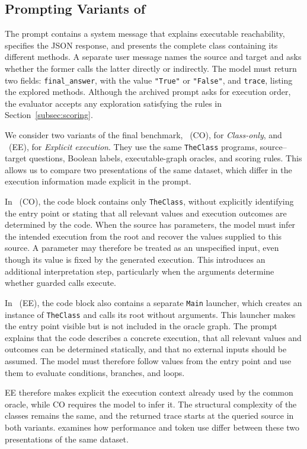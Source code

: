 \subsection{Prompting Variants of \benchmark}
\label{subsec:prompt-design}

The prompt contains a system message that explains executable reachability, specifies the JSON response, and presents the complete class containing its different methods. A separate user message names the source and target and asks whether the former calls the latter directly or indirectly. The model must return two fields: \texttt{final\_answer}, with the value \texttt{"True"} or \texttt{"False"}, and \texttt{trace}, listing the explored methods. Although the archived prompt asks for execution order, the evaluator accepts any exploration satisfying the rules in Section~\ref{subsec:scoring}.

We consider two variants of the final benchmark, \benchmark~(CO), for \emph{Class-only}, and \benchmark~(EE), for \emph{Explicit execution}. They use the same \texttt{TheClass} programs, source--target questions, Boolean labels, executable-graph oracles, and scoring rules. This allows us to compare two presentations of the same dataset, which differ in the execution information made explicit in the prompt.

In \benchmark~(CO), the code block contains only \texttt{TheClass}, without explicitly identifying the entry point or stating that all relevant values and execution outcomes are determined by the code. When the source has parameters, the model must infer the intended execution from the root and recover the values supplied to this source. A parameter may therefore be treated as an unspecified input, even though its value is fixed by the generated execution. This introduces an additional interpretation step, particularly when the arguments determine whether guarded calls execute.

In \benchmark~(EE), the code block also contains a separate \texttt{Main} launcher, which creates an instance of \texttt{TheClass} and calls its root without arguments. This launcher makes the entry point visible but is not included in the oracle graph. The prompt explains that the code describes a concrete execution, that all relevant values and outcomes can be determined statically, and that no external inputs should be assumed. The model must therefore follow values from the entry point and use them to evaluate conditions, branches, and loops.

EE therefore makes explicit the execution context already used by the common oracle, while CO requires the model to infer it. The structural complexity of the classes remains the same, and the returned trace starts at the queried source in both variants.  examines how performance and token use differ between these two presentations of the same dataset.
